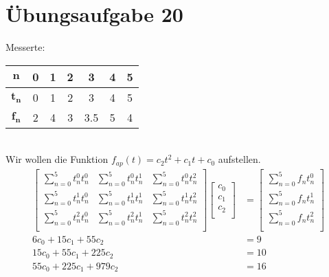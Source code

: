 

    \section*{Übungsaufgabe 20}
    Messerte: \\
    \begin{tabular}{|c|c|c|c|c|c|c|}
        \hline
        $\mathbf{n}$   & 0 & 1 & 2 & 3   & 4 & 5 \\
        \hline
        $\mathbf{t_n}$ & 0 & 1 & 2 & 3   & 4 & 5 \\
        \hline
        $\mathbf{f_n}$ & 2 & 4 & 3 & 3.5 & 5 & 4 \\
        \hline
    \end{tabular} \\
    Wir wollen die Funktion $f_{ap}(t) = c_2 t^2 + c_1 t + c_0$ aufstellen.
    \begin{align*}
        \begin{bmatrix}
            \sum_{n=0}^{5} t_n^{0} t_n^{0} &
            \sum_{n=0}^{5} t_n^{0} t_n^{1} &
            \sum_{n=0}^{5} t_n^{0} t_n^{2} \\
            \sum_{n=0}^{5} t_n^{1} t_n^{0} &
            \sum_{n=0}^{5} t_n^{1} t_n^{1} &
            \sum_{n=0}^{5} t_n^{1} t_n^{2} \\
            \sum_{n=0}^{5} t_n^{2} t_n^{0} &
            \sum_{n=0}^{5} t_n^{2} t_n^{1} &
            \sum_{n=0}^{5} t_n^{2} t_n^{2} \\
        \end{bmatrix}
        \begin{bmatrix}
            c_{0} \\
            c_{1} \\
            c_{2} \\
        \end{bmatrix}
        &=
        \begin{bmatrix}
            \sum_{n=0}^{5} f_n t_n^{0}\\
            \sum_{n=0}^{5} f_n t_n^{1}\\
            \sum_{n=0}^{5} f_n t_n^{2}\\
        \end{bmatrix}
        \\
        6 c_{0} +
        15 c_{1} +
        55 c_{2} &=
        9\\
        15 c_{0} +
        55 c_{1} +
        225 c_{2} &=
        10\\
        55 c_{0} +
        225 c_{1} +
        979 c_{2} &=
        16\\
    \end{align*}
